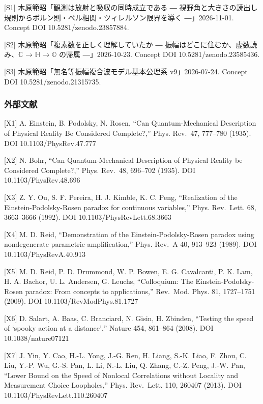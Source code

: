 \documentclass[
  a4paper,
]{ltjsarticle}
\begin{document}
{[}S1{]} 木原範昭「観測は放射と吸収の同時成立である ―
視野角と大きさの読出し規則からボルン則・ベル相関・ツィレルソン限界を導く
―」2026-11-01. Concept DOI 10.5281/zenodo.23857884.

{[}S2{]} 木原範昭「複素数を正しく理解していたか ―
振幅はどこに住むか、虚数読み、\(\mathbb{C}\) → \(\mathbb{H}\) →
\(\mathbb{O}\) の帰属 ―」2026-10-23. Concept DOI
10.5281/zenodo.23585436.

{[}S3{]} 木原範昭「無名等振幅複合波モデル基本公理系 v9」2026-07-24.
Concept DOI 10.5281/zenodo.21315735.

\subsubsection{外部文献}\label{ux5916ux90e8ux6587ux732e}

{[}X1{]} A. Einstein, B. Podolsky, N. Rosen, ``Can Quantum-Mechanical
Description of Physical Reality Be Considered Complete?,'' Phys.
Rev.~47, 777--780 (1935). DOI 10.1103/PhysRev.47.777

{[}X2{]} N. Bohr, ``Can Quantum-Mechanical Description of Physical
Reality be Considered Complete?,'' Phys. Rev.~48, 696--702 (1935). DOI
10.1103/PhysRev.48.696

{[}X3{]} Z. Y. Ou, S. F. Pereira, H. J. Kimble, K. C. Peng,
``Realization of the Einstein-Podolsky-Rosen paradox for continuous
variables,'' Phys. Rev.~Lett. 68, 3663--3666 (1992). DOI
10.1103/PhysRevLett.68.3663

{[}X4{]} M. D. Reid, ``Demonstration of the Einstein-Podolsky-Rosen
paradox using nondegenerate parametric amplification,'' Phys. Rev.~A 40,
913--923 (1989). DOI 10.1103/PhysRevA.40.913

{[}X5{]} M. D. Reid, P. D. Drummond, W. P. Bowen, E. G. Cavalcanti, P.
K. Lam, H. A. Bachor, U. L. Andersen, G. Leuchs, ``Colloquium: The
Einstein-Podolsky-Rosen paradox: From concepts to applications,''
Rev.~Mod. Phys. 81, 1727--1751 (2009). DOI 10.1103/RevModPhys.81.1727

{[}X6{]} D. Salart, A. Baas, C. Branciard, N. Gisin, H. Zbinden,
``Testing the speed of `spooky action at a distance','' Nature 454,
861--864 (2008). DOI 10.1038/nature07121

{[}X7{]} J. Yin, Y. Cao, H.-L. Yong, J.-G. Ren, H. Liang, S.-K. Liao, F.
Zhou, C. Liu, Y.-P. Wu, G.-S. Pan, L. Li, N.-L. Liu, Q. Zhang, C.-Z.
Peng, J.-W. Pan, ``Lower Bound on the Speed of Nonlocal Correlations
without Locality and Measurement Choice Loopholes,'' Phys. Rev.~Lett.
110, 260407 (2013). DOI 10.1103/PhysRevLett.110.260407
\end{document}
